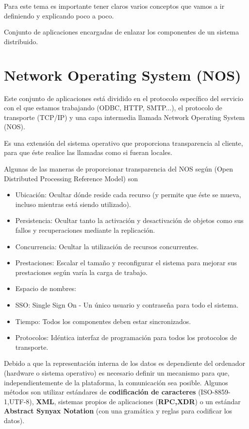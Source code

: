 Para este tema es importante tener claros varios conceptos que vamos a ir definiendo y explicando poco a poco.

\begin{defn}[Middleware]
Conjunto de aplicaciones encargadas de enlazar los componentes de un sistema distribuido.
\end{defn}

\section{Network Operating System (NOS)}
Este conjunto de aplicaciones está dividido en el protocolo específico del servicio con el que estamos trabajando (ODBC, HTTP, SMTP...), el protocolo de transporte (TCP/IP) y una capa intermedia llamada Network Operating System (NOS).

\begin{defn}
Es una extensión del sistema operativo que proporciona transparencia al cliente, para que éste realice las llamadas como si fueran locales.
\end{defn}

Algunas de las maneras de proporcionar transparencia del NOS según  (Open Distributed Processing Reference Model) son
\begin{itemize}
\item Ubicación: Ocultar dónde reside cada recurso (y permite que éste se mueva, incluso mientras está siendo utilizado).
\item Persistencia: Ocultar tanto la activación y desactivación de objetos como sus fallos y recuperaciones mediante la replicación.
\item Concurrencia: Ocultar la utilización de recursos concurrentes.
\item Prestaciones: Escalar el tamaño y reconfigurar el sistema para mejorar sus prestaciones según varía la carga de trabajo.
\item Espacio de nombres:
\item SSO: Single Sign On - Un único usuario y contraseña para todo el sistema.
\item Tiempo: Todos los componentes deben estar sincronizados.
\item Protocolos: Idéntica interfaz de programación para todos los protocolos de transporte.
\end{itemize}

Debido a que la representación interna de los datos es dependiente del ordenador (hardware o sistema operativo) es necesario definir un mecanismo para que, independientemente de la plataforma, la comunicación sea posible. Algunos métodos son utilizar estándares de \textbf{codificación de caracteres} (ISO-8859-1,UTF-8), \textbf{XML}, sistemas propios de aplicaciones (\textbf{RPC,XDR}) o un estándar \textbf{Abstract Synyax Notation} (con una gramática y reglas para codificar los datos).


